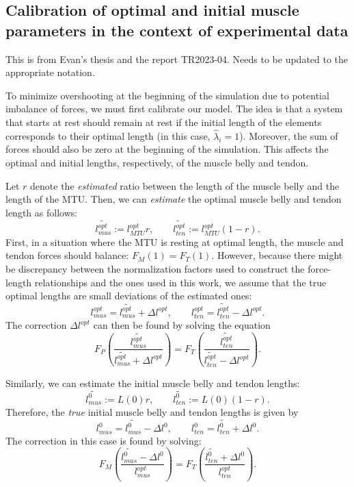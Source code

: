 \documentclass{sfuthesis}
\numberwithin{equation}{chapter}
\numberwithin{figure}{chapter}
\numberwithin{table}{chapter}
\theoremstyle{definition}
\begin{document}
\begin{appendices} %

\chapter{Calibration of optimal and initial muscle parameters in the context of experimental data}
\label{app:calibration_optimal_initial_values}

This is from Evan's thesis and the report TR2023-04. Needs to be updated to the appropriate notation.

To minimize overshooting at the beginning of the simulation due to potential imbalance of forces, we must first calibrate our model. The idea is that a system that starts at rest should remain at rest if the initial length of the elements corresponds to their optimal length (in this case, $\widehat{\lambda}_i = 1$). Moreover, the sum of forces should also be zero at the beginning of the simulation. This affects the optimal and initial lengths, respectively, of the muscle belly and tendon.


Let $r$ denote the \textit{estimated} ratio between the length of the muscle belly and the length of the MTU. Then, we can \textit{estimate} the optimal muscle belly and tendon length as follows:
\[
	\widetilde{l_{mus}^{opt}} := l_{MTU}^{opt} r, \qquad \widetilde{l_{ten}^{opt}} := l_{MTU}^{opt}(1-r).
\]
First, in a situation where the MTU is resting at optimal length, the muscle and tendon forces should balance: $F_M(1) = F_T(1)$. However, because there might be discrepancy between the normalization factors used to construct the force-length relationships and the ones used in this work, we assume that the true optimal lengths are small deviations of the estimated ones:
\[
	l_{mus}^{opt} = \widetilde{l_{mus}^{opt}} + \Delta l^{opt}, \qquad l_{ten}^{opt} = \widetilde{l_{ten}^{opt}} - \Delta l^{opt}.
\]
The correction $\Delta l^{opt}$ can then be found by solving the equation
\begin{equation}
	F_P\left( \dfrac{\widetilde{l_{mus}^{opt}}}{\widetilde{l_{mus}^{opt}} + \Delta l^{opt}} \right) = F_T \left( \dfrac{\widetilde{l_{ten}^{opt}}}{\widetilde{l_{ten}^{opt}} - \Delta l^{opt}} \right).	
\end{equation}


Similarly, we can estimate the initial muscle belly and tendon lengths:
\[
	\widetilde{l_{mus}^0} := L(0)r, \qquad \widetilde{l_{ten}^0} := L(0)(1-r).
\]
Therefore, the \textit{true} initial muscle belly and tendon lengths is given by
\[
	l_{mus}^0 = \widetilde{l_{mus}^0} - \Delta l^0, \qquad l_{ten}^0 = \widetilde{l_{ten}^0} + \Delta l^0.
\]
The correction in this case is found by solving:
\begin{equation}
	F_M \left( \dfrac{\widetilde{l_{mus}^0} - \Delta l^0}{l_{mus}^{opt}}\right) = F_T \left( \dfrac{\widetilde{l_{ten}^0} + \Delta l^0}{l_{ten}^{opt}}\right).
\end{equation}




\end{appendices}
\end{document}
